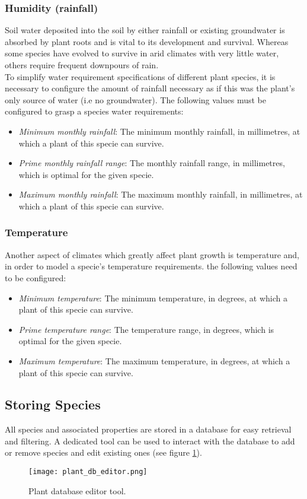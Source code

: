 \subsubsection{Humidity (rainfall)}

Soil water deposited into the soil by either rainfall or existing groundwater is absorbed by plant roots and is vital to its development and survival. Whereas some species have evolved to survive in arid climates with very little water, others require frequent downpours of rain. \\
To simplify water requirement specifications of different plant species, it is necessary to configure the amount of rainfall necessary as if this was the plant's only source of water (i.e no groundwater). The following values must be configured to grasp a species water requirements:

\begin{itemize}
\item \textit{Minimum monthly rainfall}: The minimum monthly rainfall, in millimetres, at which a plant of this specie can survive.
\item \textit{Prime monthly rainfall range}: The monthly rainfall range, in millimetres, which is optimal for the given specie.
\item \textit{Maximum monthly rainfall}: The maximum monthly rainfall, in millimetres, at which a plant of this specie can survive.\end{itemize}

\subsubsection{Temperature}

Another aspect of climates which greatly affect plant growth is temperature and, in order to model a specie's temperature requirements. the following values need to be configured:

\begin{itemize}
\item \textit{Minimum temperature}: The minimum temperature, in degrees, at which a plant of this specie can survive.
\item \textit{Prime temperature range}: The temperature range, in degrees, which is optimal for the given specie.
\item \textit{Maximum temperature}: The maximum temperature, in degrees, at which a plant of this specie can survive.
\end{itemize}

\subsection{Storing Species}

All species and associated properties are stored in a database for easy retrieval and filtering. A dedicated tool can be used to interact with the database to add or remove species and edit existing ones (see figure \ref{fig:plant_db_editor}).

\begin{figure}
\center
	\texttt{[image: plant\_db\_editor.png]}
	\caption{ Plant database editor tool.}	
	\label{fig:plant_db_editor}
\end{figure}
